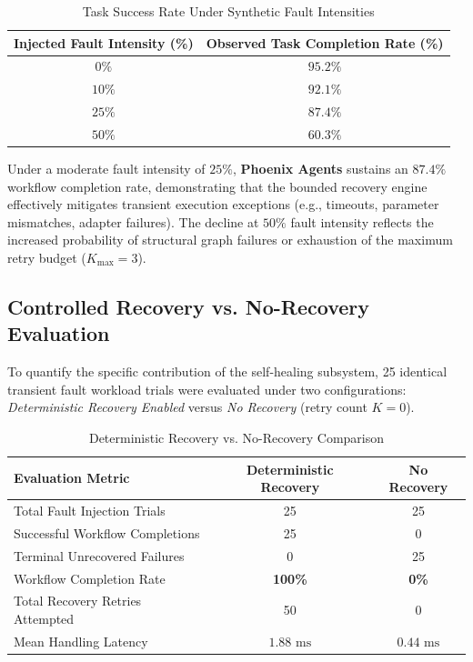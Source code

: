 \documentclass[conference]{IEEEtran}
\begin{document}
\begin{table}[htbp]
\caption{Task Success Rate Under Synthetic Fault Intensities}
\label{tab:fault_intensity_analysis}
\centering
\begin{tabular}{c c}
\toprule
\textbf{Injected Fault Intensity (\%)} & \textbf{Observed Task Completion Rate (\%)} \\
\midrule
$0\%$ & $95.2\%$ \\
$10\%$ & $92.1\%$ \\
$25\%$ & $87.4\%$ \\
$50\%$ & $60.3\%$ \\
\bottomrule
\end{tabular}
\end{table}

Under a moderate fault intensity of $25\%$, \textbf{Phoenix Agents} sustains an $87.4\%$ workflow completion rate, demonstrating that the bounded recovery engine effectively mitigates transient execution exceptions (e.g., timeouts, parameter mismatches, adapter failures). The decline at $50\%$ fault intensity reflects the increased probability of structural graph failures or exhaustion of the maximum retry budget ($K_{\text{max}}=3$).

\subsection{Controlled Recovery vs. No-Recovery Evaluation}
To quantify the specific contribution of the self-healing subsystem, 25 identical transient fault workload trials were evaluated under two configurations: \textit{Deterministic Recovery Enabled} versus \textit{No Recovery} (retry count $K=0$).

\begin{table}[htbp]
\caption{Deterministic Recovery vs. No-Recovery Comparison}
\label{tab:recovery_vs_norecovery_analysis}
\centering
\begin{tabular}{p{3.8cm} c c}
\toprule
\textbf{Evaluation Metric} & \textbf{Deterministic Recovery} & \textbf{No Recovery} \\
\midrule
Total Fault Injection Trials & 25 & 25 \\
Successful Workflow Completions & 25 & 0 \\
Terminal Unrecovered Failures & 0 & 25 \\
Workflow Completion Rate & \textbf{100\%} & \textbf{0\%} \\
Total Recovery Retries Attempted & 50 & 0 \\
Mean Handling Latency & $1.88\text{ ms}$ & $0.44\text{ ms}$ \\
\bottomrule
\end{tabular}
\end{table}
\end{document}

